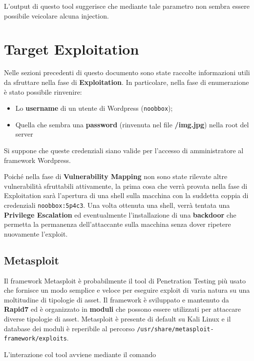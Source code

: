 \documentclass[a4paper, 12pt, oneside]{article}
\begin{document}
L'output di questo tool suggerisce che mediante tale parametro non sembra essere possibile veicolare alcuna injection.

\newpage



\section{Target Exploitation}
Nelle sezioni precedenti di questo documento sono state raccolte informazioni utili da sfruttare nella fase di \textbf{Exploitation}. In particolare, nella fase di enumerazione è stato possibile rinvenire:

\begin{itemize}
    \item Lo \textbf{username} di un utente di Wordpress (\texttt{noobbox});
    \item Quella che sembra una \textbf{password} (rinvenuta nel file \textbf{/img.jpg}) nella root del server
\end{itemize}

Si suppone che queste credenziali siano valide per l'accesso di amministratore al framework Wordpress.

Poiché nella fase di \textbf{Vulnerability Mapping} non sono state rilevate altre vulnerabilità sfruttabili attivamente, la prima cosa che verrà provata nella fase di Exploitation sarà l'apertura di una shell sulla macchina con la suddetta coppia di credenziali \texttt{noobbox:5p4c3}. 
Una volta ottenuta una shell, verrà tentata una \textbf{Privilege Escalation} ed eventualmente l'installazione di una \textbf{backdoor} che permetta la permanenza dell'attaccante sulla macchina senza dover ripetere nuovamente l'exploit.

\subsection{Metasploit}
Il framework Metasploit è probabilmente il tool di Penetration Testing più usato che fornisce un modo semplice e veloce per eseguire exploit di varia natura su una moltitudine di tipologie di asset. Il framework è sviluppato e mantenuto da \textbf{Rapid7} ed è organizzato in \textbf{moduli} \cite{metasploit} che possono essere utilizzati per attaccare diverse tipologie di asset. Metasploit è presente di default su Kali Linux e il database dei moduli è reperibile al percorso \texttt{/usr/share/metasploit-framework/exploits}.

L'interazione col tool avviene mediante il comando
\end{document}
